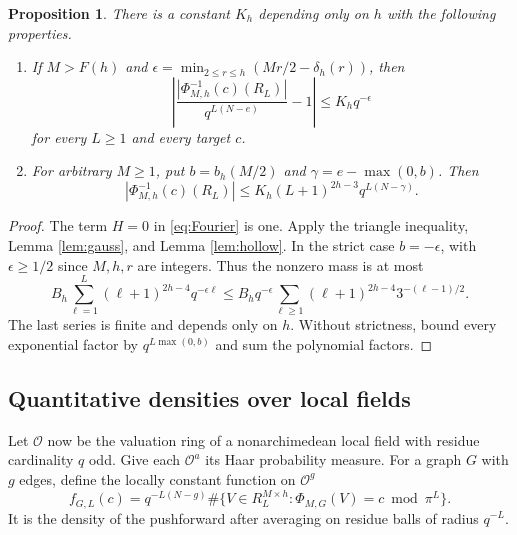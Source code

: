 \documentclass[11pt]{article}
\numberwithin{equation}{section}
\newtheorem{proposition}[theorem]{Proposition}
\theoremstyle{remark}
\begin{document}
\begin{proposition}\label{prop:count}
There is a constant $K_h$ depending only on $h$ with the following
properties.
\begin{enumerate}
\item If $M>F(h)$ and
$\epsilon=\min_{2\le r\le h}(Mr/2-\delta_h(r))$, then
\begin{equation}\label{eq:strictcount}
 \left|\frac{|\Phi_{M,h}^{-1}(c)(R_L)|}{q^{L(N-e)}}-1\right|
       \le K_hq^{-\epsilon}
\end{equation}
for every $L\ge1$ and every target $c$.
\item For arbitrary $M\ge1$, put
$b=b_h(M/2)$ and $\gamma=e-\max(0,b)$. Then
\begin{equation}\label{eq:generalcount}
 |\Phi_{M,h}^{-1}(c)(R_L)|
   \le K_h(L+1)^{2h-3}q^{L(N-\gamma)}.
\end{equation}
\end{enumerate}
\end{proposition}
\begin{proof}
The term $H=0$ in \eqref{eq:Fourier} is one. Apply the triangle
inequality, Lemma \ref{lem:gauss}, and Lemma \ref{lem:hollow}.
In the strict case $b=-\epsilon$, with $\epsilon\ge1/2$ since
$M,h,r$ are integers. Thus the nonzero mass is at most
\[
 B_h\sum_{\ell=1}^{L}(\ell+1)^{2h-4}q^{-\epsilon\ell}
 \le B_hq^{-\epsilon}
       \sum_{\ell\ge1}(\ell+1)^{2h-4}3^{-(\ell-1)/2}.
\]
The last series is finite and depends only on $h$.
Without strictness, bound every exponential factor by
$q^{L\max(0,b)}$ and sum the polynomial factors.
\end{proof}

\subsection{Quantitative densities over local fields}
Let $\mathcal O$ now be the valuation ring of a nonarchimedean local
field with residue cardinality $q$ odd. Give each $\mathcal O^a$ its
Haar probability measure. For a graph $G$ with $g$ edges, define the
locally constant function on $\mathcal O^g$
\[
 f_{G,L}(c)=q^{-L(N-g)}
   \#\{V\in R_L^{M\times h}:\Phi_{M,G}(V)=c\bmod\pi^L\}.
\]
It is the density of the pushforward after averaging on residue balls
of radius $q^{-L}$.
\end{document}
